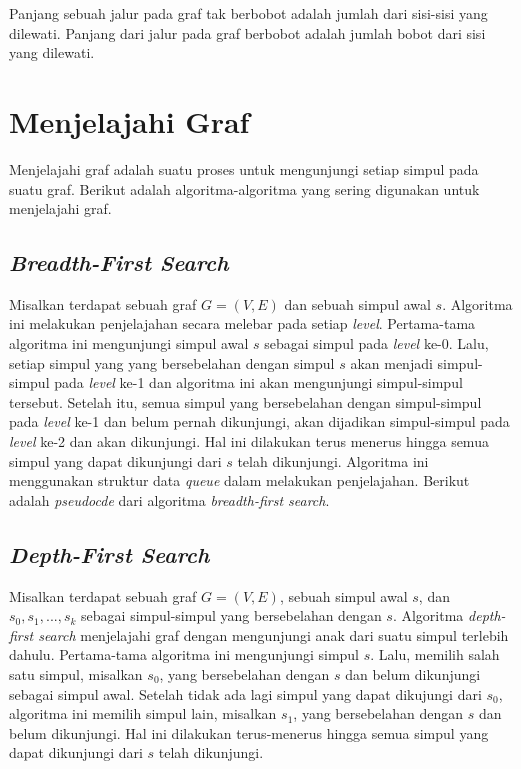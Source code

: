 Panjang sebuah jalur pada graf tak berbobot adalah jumlah dari sisi-sisi yang dilewati. 
Panjang dari jalur pada graf berbobot adalah jumlah bobot dari sisi yang dilewati.

\section{Menjelajahi Graf}

Menjelajahi graf adalah suatu proses untuk mengunjungi setiap simpul pada suatu graf. 
Berikut adalah algoritma-algoritma yang sering digunakan untuk menjelajahi graf.

  \subsection{\textit{Breadth-First Search}}
  Misalkan terdapat sebuah graf $G = (V, E)$ dan sebuah simpul awal $s$. Algoritma ini 
  melakukan penjelajahan secara melebar pada setiap \textit{level}. Pertama-tama 
  algoritma ini mengunjungi simpul awal $s$ sebagai simpul pada \textit{level} ke-0. 
  Lalu, setiap simpul yang yang bersebelahan dengan simpul $s$ akan menjadi 
  simpul-simpul pada \textit{level} ke-1 dan algoritma ini akan mengunjungi 
  simpul-simpul tersebut. Setelah itu, semua simpul yang bersebelahan dengan 
  simpul-simpul pada \textit{level} ke-1 dan belum pernah dikunjungi, akan dijadikan 
  simpul-simpul pada \textit{level} ke-2 dan akan dikunjungi. Hal ini dilakukan terus 
  menerus hingga semua simpul yang dapat dikunjungi dari $s$  telah dikunjungi. 
  Algoritma ini menggunakan struktur data \textit{queue} dalam melakukan penjelajahan. 
  Berikut adalah \textit{pseudocde} dari algoritma \textit{breadth-first search}.

  \medskip
  

  \subsection{\textit{Depth-First Search}}
  Misalkan terdapat sebuah graf $G = (V, E)$, sebuah simpul awal $s$, dan 
  $s_{0}, s_{1}, ..., s_{k}$ sebagai simpul-simpul yang bersebelahan dengan $s$. 
  Algoritma \textit{depth-first search} menjelajahi graf dengan mengunjungi anak dari 
  suatu simpul terlebih dahulu. Pertama-tama algoritma ini mengunjungi simpul $s$. 
  Lalu, memilih salah satu simpul, misalkan $s_{0}$, yang bersebelahan dengan $s$ dan 
  belum dikunjungi sebagai simpul awal. Setelah tidak ada lagi simpul yang dapat 
  dikujungi dari $s_{0}$, algoritma ini memilih simpul lain, misalkan $s_{1}$, yang 
  bersebelahan dengan $s$ dan belum dikunjungi. Hal ini dilakukan terus-menerus hingga 
  semua simpul yang dapat dikunjungi dari $s$ telah dikunjungi.

